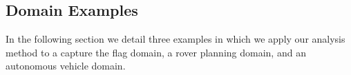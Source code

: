 \documentclass[letterpaper, 10 pt, conference]{ieeeconf}  %
\theoremstyle{definition}
\begin{document}
\newpage
\pagebreak
\clearpage

\subsection{Domain Examples}
In the following section we detail three examples in which we apply our analysis method to a capture the flag domain, a rover planning domain, and an autonomous vehicle domain. 
\begin{enumerate}


\end{enumerate}
\end{document}
